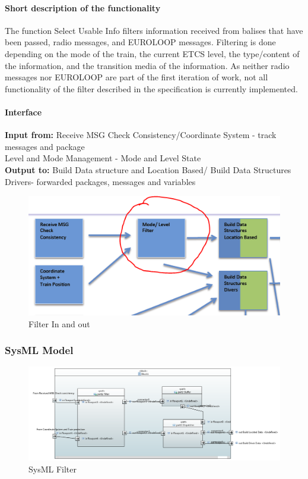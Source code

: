 \paragraph{Short description of the functionality}
The function Select Usable Info filters information received from balises that have been passed, radio messages, and EUROLOOP messages. Filtering is done depending on the mode of the train, the current ETCS level, the type/content of the information, and the transition media of the information. As neither radio messages nor EUROLOOP are part of the first iteration of work, not all functionality of the filter described in the specification is currently implemented.
\paragraph{Interface}
\textbf{Input from:} Receive MSG Check Consistency/Coordinate System - track messages and package\\
Level and Mode Management - Mode and Level State\\

\textbf{Output to:} Build Data structure and Location Based/ Build Data Structures Drivers- forwarded packages, messages and variables\\

\begin{figure}[hbtp]
\centering
\includegraphics[scale=0.7]{images/FilterInandOUt}
\caption{Filter In and out}
\end{figure}

\subsubsection{SysML Model}
\begin{figure}[hbtp]
\centering
\includegraphics [scale=0.5]{images/SysMLFilter}
\caption{SysML Filter}
\end{figure}

